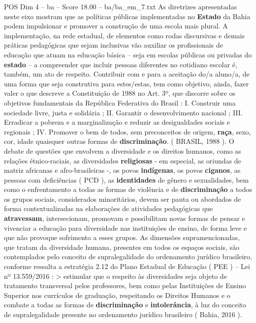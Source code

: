 \begin{textsample}{POS Dim 4 – ba – Score 18.00 – ba/ba\_em\_7.txt}
As diretrizes apresentadas neste eixo mostram que as políticas públicas implementadas no \textbf{Estado} da Bahia podem impulsionar e promover a construção de uma escola mais plural.
A implementação, na rede estadual, de elementos como rodas discursivas e demais práticas pedagógicas que sejam inclusivas vão auxiliar os profissionais de educação que atuam na educação básica – seja em escolas públicas ou privadas do \textbf{estado} – a compreender que incluir pessoas diferentes no cotidiano escolar é, também, um ato de respeito.
Contribuir com e para a aceitação do/a aluno/a, de uma forma que seja construtiva para estes/estas, tem como objetivo, ainda, fazer valer o que descreve a Constituição de 1988 no Art. 3º, que discorre sobre os objetivos fundamentais da República Federativa do Brasil : I.
Construir uma sociedade livre, justa e solidária ; II.
Garantir o desenvolvimento nacional ; III.
Erradicar a pobreza e a marginalização e reduzir as desigualdades sociais e regionais ; IV.
Promover o bem de todos, sem preconceitos de origem, \textbf{raça}, sexo, cor, idade quaisquer outras formas de \textbf{discriminação}. ( BRASIL, 1988 ).
O debate de questões que envolvem a diversidade e os direitos humanos, como as relações étnico-raciais, as diversidades \textbf{religiosas} - em especial, as oriundas de matriz africanas e afro-brasileiras -, os povos \textbf{indígenas}, os povos \textbf{ciganos}, as pessoas com deficiências ( PCD ), as \textbf{identidades} de gênero e sexualidades, bem como o enfrentamento a todas as formas de violência e de \textbf{discriminação} a todos os grupos sociais, considerados minoritários, devem ser pauta ou abordados de forma contextualizadas na elaborações de atividades pedagógicas que \textbf{atravessam}, intersecionam, promovam e possibilitam novas formas de pensar e vivenciar a educação para diversidade nas instituições de ensino, de forma leve e que não provoque sofrimento a esses grupos.
As dimensões supramencionadas, que tratam da diversidade humana, presentes em todos os espaços sociais, são contemplados pelo conceito de supralegalidade do ordenamento jurídico brasileiro, conforme ressalta a estratégia 2.12 do Plano Estadual de Educação ( PEE ) – Lei nº 13.559/2016 : > estimular que o respeito às diversidades seja objeto de tratamento transversal pelos professores, bem como pelas Instituições de Ensino Superior nos currículos de graduação, respeitando os Direitos Humanos e o combate a todas as formas de \textbf{discriminação} e \textbf{intolerância}, à luz do conceito de supralegalidade presente no ordenamento jurídico brasileiro ( Bahia, 2016 ).

\end{textsample}
